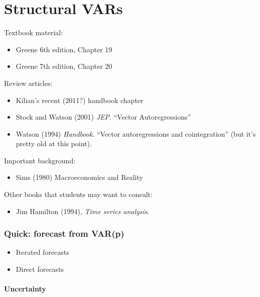 
\part{Structural VARs}

Textbook material:
\begin{itemize}
\item Greene 6th edition, Chapter 19
\item Greene 7th edition, Chapter 20
\end{itemize}
Review articles:
\begin{itemize}
\item Kilian's recent (2011?) handbook chapter
\item Stock and Watson (2001) \emph{JEP}. ``Vector Autoregressions''
\item Watson (1994) \emph{Handbook}. ``Vector autoregressions and
  cointegration'' (but it's pretty old at this point).
\end{itemize}
Important background:
\begin{itemize}
\item Sims (1980) Macroeconomics and Reality
\end{itemize}
Other books that students may want to consult:
\begin{itemize}
\item Jim Hamilton (1994), \emph{Time series analysis}.
\end{itemize}

\section{Quick: forecast from VAR(p)}

\begin{itemize}
\item Iterated forecasts
\item Direct forecasts
\end{itemize}

\subsection{Uncertainty}


